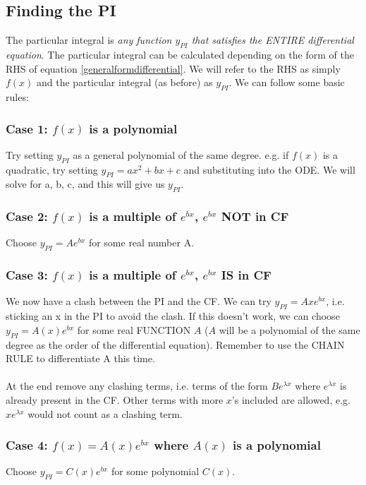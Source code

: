 \documentclass{scrartcl}
\begin{document}
\subsection{Finding the PI}
The particular integral is \emph{any function $ y_{PI} $ that satisfies the ENTIRE differential equation}. The particular integral can be calculated depending on the form of the RHS of equation \ref{generalformdifferential}. We will refer to the RHS as simply $ f(x) $ and the particular integral (as before) as $ y_{PI} $. We can follow some basic rules:


\subsubsection*{Case 1: $ f(x) $ is a polynomial}
Try setting $ y_{PI} $ as a general polynomial of the same degree. e.g. if $ f(x) $ is a quadratic, try setting $ y_{PI} = ax^{2} + bx + c $ and substituting into the ODE. We will solve for a, b, c, and this will give us $ y_{PI} $.

\subsubsection*{Case 2: $ f(x) $ is a multiple of $ e^{bx} $, $ e^{bx} $ NOT in CF}
Choose $ y_{PI} = Ae^{bx} $ for some real number A.

\subsubsection*{Case 3: $ f(x) $ is a multiple of $ e^{bx} $, $ e^{bx} $ IS in CF}
We now have a clash between the PI and the CF. We can try $ y_{PI} = Axe^{bx} $, i.e. sticking an x in the PI to avoid the clash. If this doesn't work, we can choose $ y_{PI} = A(x)e^{bx} $ for some real FUNCTION $ A $ ($ A $ will be a polynomial of the same degree as the order of the differential equation). Remember to use the CHAIN RULE to differentiate A this time.
\\\\
At the end remove any clashing terms, i.e. terms of the form $ Be^{\lambda x} $ where $ e^{\lambda x} $ is already present in the CF. Other terms with more $ x $'s included are allowed, e.g. $ xe^{\lambda x} $ would not count as a clashing term.

\subsubsection*{Case 4: $ f(x) = A(x)e^{bx} $ where $ A(x) $ is a polynomial}
Choose $ y_{PI} = C(x)e^{bx} $ for some polynomial $ C(x) $.
\end{document}
